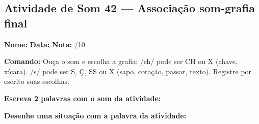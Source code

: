 \subsection{Atividade de Som 42 --- Associação som-grafia final}
\begin{exercicio}



\noindent\textbf{Nome:} \underline{\hspace{3.2cm}} \quad \textbf{Data:} \underline{\hspace{1.6cm}} \quad \textbf{Nota:} \underline{\hspace{0.9cm}}/10


\noindent\textbf{Comando:} Ouça o som e escolha a grafia: /ch/ pode ser CH ou X (chave, xícara). /s/ pode ser S, Ç, SS ou X (sapo, coração, passar, texto). Registre por escrito suas escolhas.


\begin{center}
\end{center}

\noindent\textbf{Escreva 2 palavras com o som da atividade:}

\begin{center}
  \underline{\hspace{3cm}} \quad \underline{\hspace{3cm}}
\end{center}

\noindent\textbf{Desenhe uma situação com a palavra da atividade:}

\begin{center}
\end{center}

\end{exercicio}



